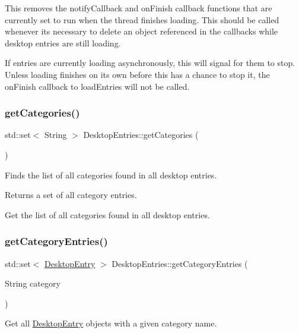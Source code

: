 This removes the notify\+Callback and on\+Finish callback functions that are currently set to run when the thread finishes loading. This should be called whenever it\textquotesingle{}s necessary to delete an object referenced in the callbacks while desktop entries are still loading.

If entries are currently loading asynchronously, this will signal for them to stop. Unless loading finishes on its own before this has a chance to stop it, the on\+Finish callback to load\+Entries will not be called. \mbox{\label{classDesktopEntries_ae3fadcd522793a38145d0815143532d9}} 
\subsubsection{\texorpdfstring{get\+Categories()}{getCategories()}}
{\footnotesize\ttfamily std\+::set$<$ String $>$ Desktop\+Entries\+::get\+Categories (\begin{DoxyParamCaption}{ }\end{DoxyParamCaption})}

Finds the list of all categories found in all desktop entries.

\begin{DoxyReturn}{Returns}
a set of all category entries.
\end{DoxyReturn}
Get the list of all categories found in all desktop entries. \mbox{\label{classDesktopEntries_a4c6b03297e85398db665df5df63fd168}} 
\subsubsection{\texorpdfstring{get\+Category\+Entries()}{getCategoryEntries()}}
{\footnotesize\ttfamily std\+::set$<$ \mbox{\hyperlink{classDesktopEntry}{Desktop\+Entry}} $>$ Desktop\+Entries\+::get\+Category\+Entries (\begin{DoxyParamCaption}\item[{String}]{category }\end{DoxyParamCaption})}

Get all \mbox{\hyperlink{classDesktopEntry}{Desktop\+Entry}} objects with a given category name.



